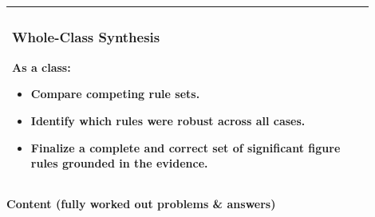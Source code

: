 \documentclass{article}
\begin{document}
\begin{tabular}{|p{0.9\linewidth}|}
\subsubsection*{Whole-Class Synthesis}

As a class:
\begin{itemize}
    \item Compare competing rule sets.
    \item Identify which rules were robust across all cases.
    \item Finalize a complete and correct set of significant figure rules grounded in the evidence.
\end{itemize} \\

\hline
\end{tabular}


\newpage
\noindent
{\large \textbf{Content (fully worked out problems \& answers)}} \\[0.2em]
\end{document}
